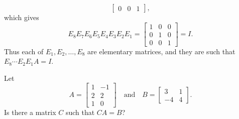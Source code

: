 \begin{solution}
\begin{equation*}
\begin{bmatrix}
      0 & 0 & 1
    \end{bmatrix},
  \end{equation*}
  which gives
  \begin{equation*}
    E_8E_7E_6E_5E_4E_3E_2E_1 =
    \begin{bmatrix}
      1 & 0 & 0 \\
      0 & 1 & 0 \\
      0 & 0 & 1
    \end{bmatrix}
    = I.
  \end{equation*}
  Thus each of $E_1,E_2,\dots,E_8$ are elementary matrices, and they
  are such that $E_8\cdots E_2E_1A = I$.
\end{solution}

 Let
\begin{equation*}
  A =
  \begin{bmatrix}
    1 & -1 \\
    2 & 2 \\
    1 & 0
  \end{bmatrix}
  \quad\text{and}\quad
  B =
  \begin{bmatrix}
    3 & 1 \\
    -4 & 4
  \end{bmatrix}.
\end{equation*}
Is there a matrix $C$ such that $CA = B$?
